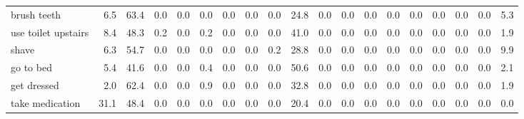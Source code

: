 \documentclass{article}
\begin{document}
\begin{sideways}
\begin{tabular}{lrrrrrrrrrrrrrrrrrr}
brush teeth                   &         6.5 &               63.4 &           0.0 &                          0.0 &                0.0 &                0.0 &                        0.0 &          0.0 &             24.8 &                0.0 &                    0.0 &                      0.0 &                  0.0 &                   0.0 &              0.0 &              0.0 &                                  0.0 &          5.3 \\
use toilet upstairs           &         8.4 &               48.3 &           0.2 &                          0.0 &                0.2 &                0.0 &                        0.0 &          0.0 &             41.0 &                0.0 &                    0.0 &                      0.0 &                  0.0 &                   0.0 &              0.0 &              0.0 &                                  0.0 &          1.9 \\
shave                         &         6.3 &               54.7 &           0.0 &                          0.0 &                0.0 &                0.0 &                        0.0 &          0.2 &             28.8 &                0.0 &                    0.0 &                      0.0 &                  0.0 &                   0.0 &              0.0 &              0.0 &                                  0.0 &          9.9 \\
go to bed                     &         5.4 &               41.6 &           0.0 &                          0.0 &                0.4 &                0.0 &                        0.0 &          0.0 &             50.6 &                0.0 &                    0.0 &                      0.0 &                  0.0 &                   0.0 &              0.0 &              0.0 &                                  0.0 &          2.1 \\
get dressed                   &         2.0 &               62.4 &           0.0 &                          0.0 &                0.9 &                0.0 &                        0.0 &          0.0 &             32.8 &                0.0 &                    0.0 &                      0.0 &                  0.0 &                   0.0 &              0.0 &              0.0 &                                  0.0 &          1.9 \\
take medication               &        31.1 &               48.4 &           0.0 &                          0.0 &                0.0 &                0.0 &                        0.0 &          0.0 &             20.4 &                0.0 &                    0.0 &                      0.0 &                  0.0 &                   0.0 &              0.0 &              0.0 &                                  0.0 &          0.0 \\

\end{tabular}
\end{sideways}
\end{document}
